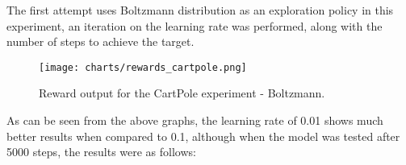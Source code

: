 The first attempt uses Boltzmann distribution as an exploration policy %
in this experiment, an iteration on the learning rate was performed, along with the number of steps to achieve the target.

\begin{figure}[H]
 \centering
 \texttt{[image: charts/rewards\_cartpole.png]}
 \caption{Reward output for the CartPole experiment - Boltzmann. }
 \end{figure}

As can be seen from the above graphs, the learning rate of 0.01 shows much better results when compared to 0.1, although when the model was tested after 5000 steps, the results were as follows:
